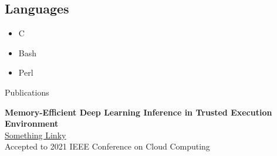 \documentclass[10pt,a4paper]{article}
\begin{document}
{\begin{tcolorbox}
  \section*{Languages}
  \begin{itemize}
    \item{C}
    \item{Bash}
    \item{Perl}
  \end{itemize}

\end{tcolorbox}


\begin{tcolorbox}

  {\selectfont
    \begin{center}
      \LARGE{Publications}
    \end{center}
  }

  \tcblower

  \textbf{Memory-Efficient Deep Learning Inference in Trusted Execution Environment} \\
  \href{http://arxiv-export-lb.library.cornell.edu/abs/2104.15109?context=cs.LG}{Something Linky} \\
  Accepted to 2021 IEEE Conference on Cloud Computing \\
\end{tcolorbox}
}
\end{document}
